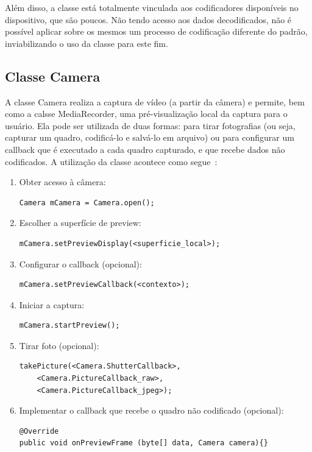 \documentclass{acm_proc_article-sp}
\begin{document}
Além disso, a classe está totalmente vinculada aos codificadores disponíveis no dispositivo, que são poucos. Não tendo acesso aos dados decodificados, não é possível aplicar sobre os mesmos um processo de codificação diferente do padrão, inviabilizando o uso da classe para este fim.

\subsection{Classe Camera}
A classe Camera realiza a captura de vídeo (a partir da câmera) e permite, bem como a calsse MediaRecorder, uma pré-visualização local da captura para o usuário. Ela pode ser utilizada de duas formas: para tirar fotografias (ou seja, capturar um quadro, codificá-lo e salvá-lo em arquivo) ou para configurar um callback que é executado a cada quadro capturado, e que recebe dados não codificados. A utilização da classe acontece como segue~\cite{developers_android}:

\begin{enumerate}
 \item Obter acesso à câmera:
  \begin{lstlisting}
Camera mCamera = Camera.open();
  \end{lstlisting}
 \item Escolher a superfície de preview:
  \begin{lstlisting}
mCamera.setPreviewDisplay(<superficie_local>);
  \end{lstlisting}
 \item Configurar o callback (opcional):
  \begin{lstlisting}
mCamera.setPreviewCallback(<contexto>);
  \end{lstlisting}
 \item Iniciar a captura:
  \begin{lstlisting}
mCamera.startPreview();
  \end{lstlisting}
 \item Tirar foto (opcional):
  \begin{lstlisting}
takePicture(<Camera.ShutterCallback>,
    <Camera.PictureCallback_raw>,
    <Camera.PictureCallback_jpeg>);
  \end{lstlisting}
 \item Implementar o callback que recebe o quadro não codificado (opcional):
  \begin{lstlisting}
@Override
public void onPreviewFrame (byte[] data, Camera camera){}
  \end{lstlisting}
\end{enumerate}
\end{document}
